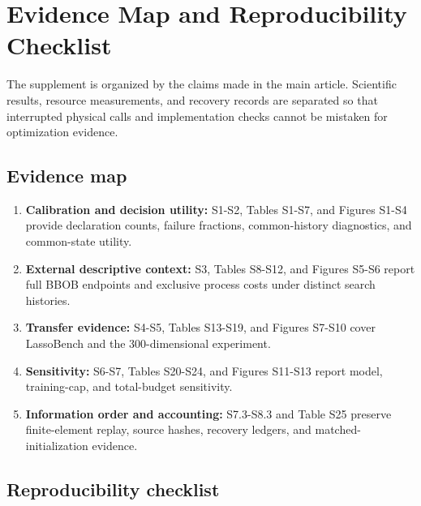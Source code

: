 \documentclass[cmc,article,submit,moreauthors,pdftex]{Definitions/tsp}
\providecommand{\tightlist}{\setlength{\itemsep}{0pt}\setlength{\parskip}{0pt}}
\begin{document}
\hypertarget{evidence-map-and-reproducibility-checklist}{%
\section{Evidence Map and Reproducibility Checklist}\label{evidence-map-and-reproducibility-checklist}}

The supplement is organized by the claims made in the main article. Scientific results, resource measurements, and recovery records are separated so that interrupted physical calls and implementation checks cannot be mistaken for optimization evidence.

\hypertarget{evidence-map}{%
\subsection{Evidence map}\label{evidence-map}}

\begin{enumerate}
\def\labelenumi{\arabic{enumi}.}
\tightlist
\item
  \textbf{Calibration and decision utility:} S1-S2, Tables S1-S7, and Figures S1-S4 provide declaration counts, failure fractions, common-history diagnostics, and common-state utility.
\item
  \textbf{External descriptive context:} S3, Tables S8-S12, and Figures S5-S6 report full BBOB endpoints and exclusive process costs under distinct search histories.
\item
  \textbf{Transfer evidence:} S4-S5, Tables S13-S19, and Figures S7-S10 cover LassoBench and the 300-dimensional experiment.
\item
  \textbf{Sensitivity:} S6-S7, Tables S20-S24, and Figures S11-S13 report model, training-cap, and total-budget sensitivity.
\item
  \textbf{Information order and accounting:} S7.3-S8.3 and Table S25 preserve finite-element replay, source hashes, recovery ledgers, and matched-initialization evidence.
\end{enumerate}

\hypertarget{reproducibility-checklist}{%
\subsection{Reproducibility checklist}\label{reproducibility-checklist}}
\end{document}
